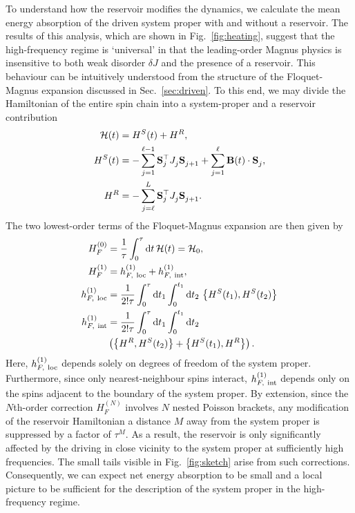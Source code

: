 \documentclass[aps,pre,twocolumn,notitlepage,floats,10pt]{revtex4-1}
\def\d{\mathrm{d}}
\def\ptop{{\vphantom\top}}
\newcommand{\beA}{\begin{equation}\begin{aligned}}
\newcommand{\eeA}{\end{aligned}\end{equation}}
\begin{document}
To understand how the reservoir modifies the dynamics, we calculate the mean
energy absorption of the driven system proper with and without a reservoir.
The results of this analysis, which are shown in Fig.~\ref{fig:heating},
suggest that the high-frequency regime is `universal' in that the leading-order
Magnus physics is insensitive to both weak disorder $\delta J$ and the presence
of a reservoir.
This behaviour can be intuitively understood from the structure of the
Floquet-Magnus expansion discussed in Sec.~\ref{sec:driven}.
To this end, we may divide the Hamiltonian of the entire spin chain into a
system-proper and a reservoir contribution
\beA
\mathcal{H}(t) &= H^S(t) + H^R, \\
H^S(t) &= -\sum_{j=1}^{\ell-1} {\bf S}_j^\top J_j^\ptop {\bf S}_{j+1}^\ptop
+ \sum_{j=1}^\ell {\bf B}(t) \cdot {\bf S}_j^\ptop, \\
H^R &= -\sum_{j=\ell}^{L} {\bf S}_j^\top J_j^\ptop {\bf S}_{j+1}^\ptop .
\eeA
The two lowest-order terms of the Floquet-Magnus expansion are then given by
\beA
H_F^{(0)} &= \frac{1}{\tau} \int_0^\tau \d t\, \mathcal{H}(t) = \mathcal{H}_0,\\
H_F^{(1)} &= h^{(1)}_{F,\ {\rm loc}} + h^{(1)}_{F,\ {\rm int}}, \\
h^{(1)}_{F,\ {\rm loc}} &= \frac{1}{2!\tau} \int_0^\tau \d t_1 \int_0^{t_1} \d t_2\, \left\{ H^S(t_1), H^S(t_2) \right\} \\
h^{(1)}_{F,\ {\rm int}} &= \frac{1}{2!\tau} \int_0^\tau \d t_1 \int_0^{t_1} \d t_2 \\
&\left(
\left\{ H^R, H^S(t_2) \right\}
+
\left\{ H^S(t_1), H^R \right\}
\right).
\eeA
Here, $h^{(1)}_{F,\ {\rm loc}}$ depends solely on degrees of freedom of the
system proper.
Furthermore, since only nearest-neighbour spins interact, $h^{(1)}_{F,\ {\rm
int}}$ depends only on the spins adjacent to the boundary of the system proper.
By extension, since the $N$th-order correction $H_F^{(N)}$ involves $N$ nested
Poisson brackets, any modification of the reservoir Hamiltonian a distance $M$
away from the system proper is suppressed by a factor of $\tau^M$.
As a result, the reservoir is only significantly affected by the driving in
close vicinity to the system proper at sufficiently high frequencies.
The small tails visible in Fig.~\ref{fig:sketch} arise from such corrections.
Consequently, we can expect net energy absorption to be small and a local
picture to be sufficient for the description of the system proper in the
high-frequency regime.
\end{document}
